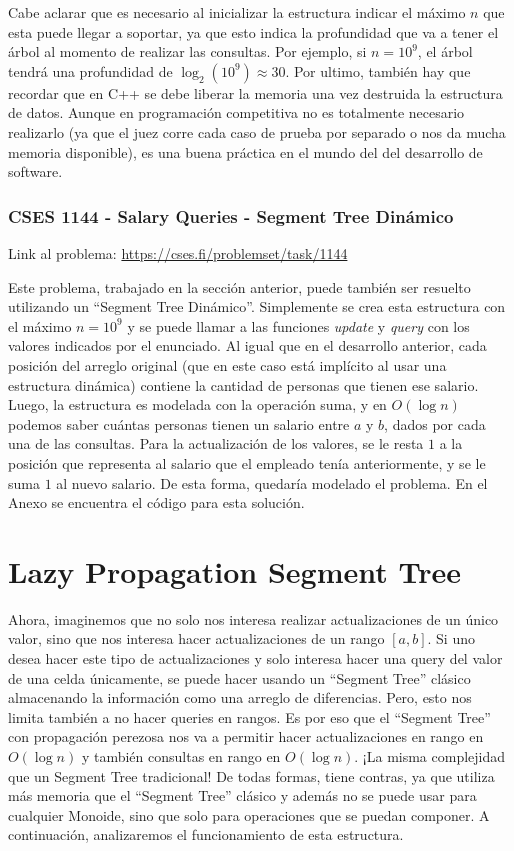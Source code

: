 \documentclass{article}
\begin{document}
Cabe aclarar que es necesario al inicializar la estructura indicar el máximo $n$ que esta puede llegar a soportar, ya que esto indica la profundidad que va a tener el árbol al momento de realizar las consultas. Por ejemplo, si $n=10^9$, el árbol tendrá una profundidad de $\log_2(10^9)\approx30$. Por ultimo, también hay que recordar que en C++ se debe liberar la memoria una vez destruida la estructura de datos. Aunque en programación competitiva no es totalmente necesario realizarlo (ya que el juez corre cada caso de prueba por separado o nos da mucha memoria disponible), es una buena práctica en el mundo del del desarrollo de software.

\subsubsection{CSES 1144 - Salary Queries - Segment Tree Dinámico}

Link al problema: \href{https://cses.fi/problemset/task/1144}{https://cses.fi/problemset/task/1144}

Este problema, trabajado en la sección anterior, puede también ser resuelto utilizando un ``Segment Tree Dinámico''. Simplemente se crea esta estructura con el máximo $n=10^9$ y se puede llamar a las funciones \textit{update} y \textit{query} con los valores indicados por el enunciado. Al igual que en el desarrollo anterior, cada posición del arreglo original (que en este caso está implícito al usar una estructura dinámica) contiene la cantidad de personas que tienen ese salario. Luego, la estructura es modelada con la operación suma, y en $O(\log n)$ podemos saber cuántas personas tienen un salario entre $a$ y $b$, dados por cada una de las consultas. Para la actualización de los valores, se le resta $1$ a la posición que representa al salario que el empleado tenía anteriormente, y se le suma $1$ al nuevo salario. De esta forma, quedaría modelado el problema. En el Anexo se encuentra el código para esta solución.

\section{Lazy Propagation Segment Tree}

Ahora, imaginemos que no solo nos interesa realizar actualizaciones de un único valor, sino que nos interesa hacer actualizaciones de un rango $[a,b]$. Si uno desea hacer este tipo de actualizaciones y solo interesa hacer una query del valor de una celda únicamente, se puede hacer usando un ``Segment Tree'' clásico almacenando la información como una arreglo de diferencias. Pero, esto nos limita también a no hacer queries en rangos. Es por eso que el ``Segment Tree'' con propagación perezosa nos va a permitir hacer actualizaciones en rango en $O(\log n)$ y también consultas en rango en $O(\log n)$. ¡La misma complejidad que un Segment Tree tradicional! De todas formas, tiene contras, ya que utiliza más memoria que el ``Segment Tree'' clásico y además no se puede usar para cualquier Monoide, sino que solo para operaciones que se puedan componer. A continuación, analizaremos el funcionamiento de esta estructura.
\end{document}
